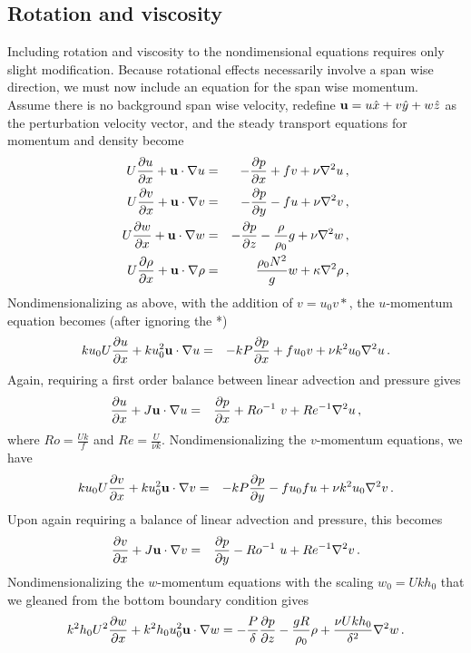 \documentclass[12pt]{article}
\begin{document}
\subsection{Rotation and viscosity}
Including rotation and viscosity to the nondimensional equations requires only slight modification. Because rotational effects necessarily involve a span wise direction, we must now include an equation for the span wise momentum. Assume there is no background span wise velocity, redefine $\mathbf{u} = u\hat{x} + v\hat{y} + w\hat{z}$ as the perturbation velocity vector, and the steady transport equations for momentum and density become
\begin{eqnarray*}
U \frac{\partial{u}}{\partial{x}} + \mathbf{u}\cdot\nabla u &=& -\frac{\partial{p}}{\partial{x}} + fv + \nu \nabla^2 u\,,\\
U \frac{\partial{v}}{\partial{x}} + \mathbf{u}\cdot\nabla v &=& -\frac{\partial{p}}{\partial{y}} - fu + \nu \nabla^2 v\,,\\
U \frac{\partial{w}}{\partial{x}} + \mathbf{u}\cdot\nabla w &=& -\frac{\partial{p}}{\partial{z}} - \frac{\rho}{\rho_0} g + \nu \nabla^2 w\,,\\
U \frac{\partial{\rho}}{\partial{x}} + \mathbf{u}\cdot\nabla\rho &=& \frac{\rho_0 N^2}{g} w + \kappa \nabla^2 \rho\,,
\end{eqnarray*}
Nondimensionalizing as above, with the addition of $v = u_0v*$, the $u$-momentum equation becomes (after ignoring the *)
\begin{eqnarray*}
k u_0 U \frac{\partial{u}}{\partial{x}} + k u_0^2\mathbf{u}\cdot\nabla u  &=& -k P \frac{\partial{p}}{\partial{x}} + fu_0v + \nu k^2 u_0 \nabla^2 u \,.
\end{eqnarray*}
Again, requiring a first order balance between linear advection and pressure gives
\begin{eqnarray*}
\frac{\partial{u}}{\partial{x}} + J\mathbf{u}\cdot\nabla u  &=& \frac{\partial{p}}{\partial{x}} +Ro^{-1} \ v + Re^{-1}\nabla^2 u \,,
\end{eqnarray*}
where $Ro =  \frac{Uk}{f}$ and $Re = \frac{U}{\nu k}$.
Nondimensionalizing the $v$-momentum equations, we have
\begin{eqnarray*}
k u_0 U  \frac{\partial{v}}{\partial{x}} +k u_0^2 \mathbf{u}\cdot\nabla v &=& -k P\frac{\partial{p}}{\partial{y}} - fu_0fu + \nu k^2 u_0 \nabla^2 v\,.
\end{eqnarray*}
Upon again requiring a balance of linear advection and pressure, this becomes
\begin{eqnarray*}
	\frac{\partial{v}}{\partial{x}} + J\mathbf{u}\cdot\nabla v  &=& \frac{\partial{p}}{\partial{y}} - Ro^{-1} \ u + Re^{-1}\nabla^2 v \,.
\end{eqnarray*}
Nondimensionalizing the $w$-momentum equations with the scaling $w_0 = Uk h_0$ that we gleaned from the bottom boundary condition gives
\[
k^2 h_0 U^2 \frac{\partial{w}}{\partial{x}} + k^2 h_0 u_0^2\mathbf{u}\cdot\nabla w = -\frac{P}{\delta}\frac{\partial{p}}{\partial{z}} - \frac{g R}{\rho_0} \rho + \frac{\nu U k h_0 }{\delta^2}\nabla^2 w\,.
\]
\end{document}
